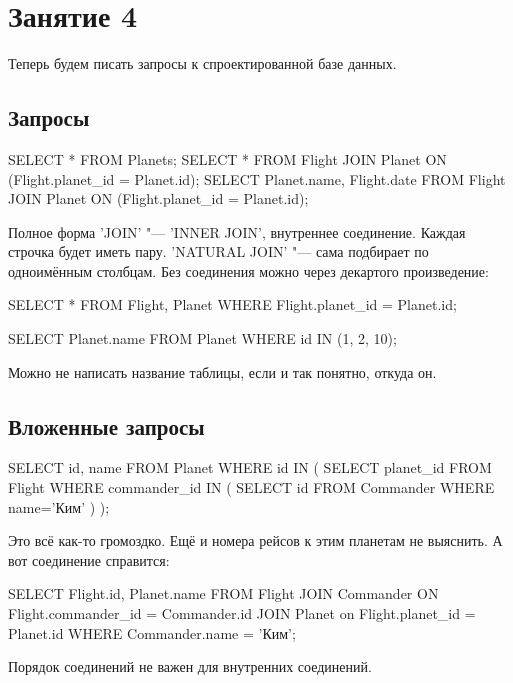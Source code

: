 \chapter{Занятие 4}

Теперь будем писать запросы к спроектированной базе данных.

\section{Запросы}

\begin{sqlcode}
SELECT * FROM Planets;
SELECT *
	FROM Flight
		JOIN Planet ON (Flight.planet_id = Planet.id);
SELECT Planet.name, Flight.date
	FROM Flight
		JOIN Planet ON (Flight.planet_id = Planet.id);
\end{sqlcode}
Полное форма \sql'JOIN' "--- \sql'INNER JOIN', внутреннее соединение.
Каждая строчка будет иметь пару.
\sql'NATURAL JOIN' "--- сама подбирает по одноимённым столбцам.
Без соединения можно через декартого произведение:
\begin{sqlcode}
SELECT *
	FROM Flight, Planet
	WHERE Flight.planet_id = Planet.id;

SELECT Planet.name
	FROM Planet
	WHERE id IN (1, 2, 10);
\end{sqlcode}
Можно не написать название таблицы, если и так понятно, откуда он.

\section{Вложенные запросы}
\begin{sqlcode}
SELECT id, name
	FROM Planet
	WHERE id IN (
		SELECT planet_id
			FROM Flight
			WHERE commander_id IN (
				SELECT id
					FROM Commander
					WHERE name='Ким'
			)
	);
\end{sqlcode}
Это всё как-то громоздко.
Ещё и номера рейсов к этим планетам не выяснить.
А вот соединение справится:
\begin{sqlcode}
SELECT Flight.id, Planet.name
	FROM Flight
		JOIN Commander ON Flight.commander_id = Commander.id
		JOIN Planet on Flight.planet_id = Planet.id
	WHERE
		Commander.name = 'Ким';
\end{sqlcode}
Порядок соединений не важен для внутренних соединений.

